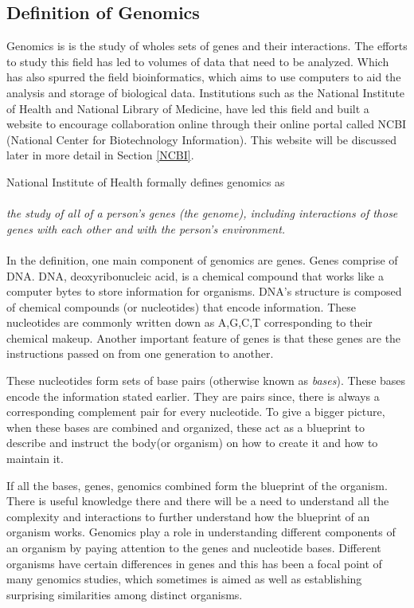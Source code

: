 \documentclass[acmsmall]{acmart}
\begin{document}
\subsection{Definition of Genomics}
Genomics is is the study of wholes sets of genes and their interactions\cite[~p.437]{campbell}. The efforts to study this field has led to volumes of data that need to be analyzed. Which has also spurred the field bioinformatics, which aims to use computers to aid the analysis and storage of biological data. Institutions such as the National Institute of Health and National Library of Medicine, have led this field and built a website to encourage collaboration online through their online portal called NCBI (National Center for Biotechnology Information). \cite[~p.438]{campbell} This website will be discussed later in more detail in Section \ref{NCBI}.

National Institute of Health \cite{genomics-definition} formally defines genomics as \\ \\
\textit{the study of all of a person's genes (the genome), including interactions of those genes with each other and with the person's environment.} \\ \\

In the definition, one main component of genomics are genes. Genes comprise of DNA. DNA, deoxyribonucleic acid, is a chemical compound that works like a computer bytes to store information for organisms. DNA's structure is composed of chemical compounds (or nucleotides) that encode information. These nucleotides are commonly written down as A,G,C,T corresponding to their chemical makeup\cite{alberts_mole}. Another important feature of genes is that these genes are the instructions passed on from one generation to another. \cite[p.~2]{hartl2018}

These nucleotides form sets of base pairs (otherwise known as \textit{bases}). These bases encode the information stated earlier. They are pairs since, there is always a corresponding complement pair for every nucleotide. To give a bigger picture, when these bases are combined and organized, these act as a blueprint to describe and instruct the body(or organism) on how to create it and how to maintain it.\cite{alberts_mole}

If all the bases, genes, genomics combined form the blueprint of the organism. There is useful knowledge there and there will be a need to understand all the complexity and interactions to further understand how the blueprint of an organism works. Genomics play a role in understanding different components of an organism by paying attention to the genes and nucleotide bases. Different organisms have certain differences in genes and this has been a focal point of many genomics studies, which sometimes is aimed as well as establishing surprising similarities among distinct organisms.
\end{document}
